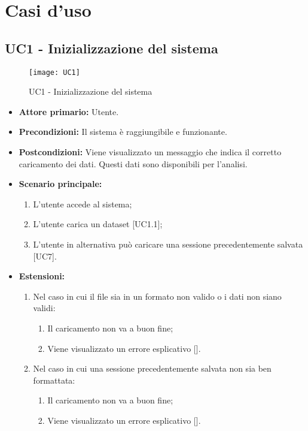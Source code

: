 \chapter{Casi d'uso}

\section{UC1 - Inizializzazione del sistema}
\begin{figure}[h]
  \centering
  \texttt{[image: UC1]}
  \caption{UC1 - Inizializzazione del sistema}
\end{figure}
\begin{itemize}
     \item \textbf{Attore primario:} Utente.
     \item \textbf{Precondizioni:} Il sistema è raggiungibile e funzionante.
     \item \textbf{Postcondizioni:} Viene visualizzato un messaggio che indica il corretto caricamento dei dati. Questi dati sono disponibili per l'analisi.
     \item \textbf{Scenario principale:}
     \begin{enumerate}
       \item L'utente accede al sistema;
       \item L'utente carica un dataset [UC1.1];
       \item L'utente in alternativa può caricare una sessione precedentemente salvata [UC7].
     \end{enumerate}
     \item \textbf{Estensioni:}
     \begin{enumerate}
       \item Nel caso in cui il file sia in un formato non valido o i dati non siano validi:
       \begin{enumerate}
         \item Il caricamento non va a buon fine;
         \item Viene visualizzato un errore esplicativo [].
       \end{enumerate}
       \item Nel caso in cui una sessione precedentemente salvata non sia ben formattata:
       \begin{enumerate}
         \item Il caricamento non va a buon fine;
         \item Viene visualizzato un errore esplicativo [].
       \end{enumerate}
     \end{enumerate}
\end{itemize}
